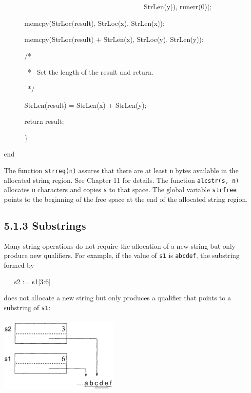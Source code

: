 {\ttfamily\mdseries
\ \ \ \ \ \ \ \ \ \ \ \ \ \ \ \ \ \ \ \ \ \ \ \ \ \ \ \ \ \ \ \ \ \ \ \ \ \ \ \ \ StrLen(y)), runerr(0));}

{\ttfamily\mdseries
\ \ \ \ \ \ memcpy(StrLoc(result), StrLoc(x), StrLen(x));}

{\ttfamily\mdseries
\ \ \ \ \ \ memcpy(StrLoc(result) + StrLen(x), StrLoc(y), StrLen(y));}


\bigskip

{\ttfamily\mdseries
\ \ \ \ \ \ /*}

{\ttfamily\mdseries
\ \ \ \ \ \ \ * \ Set the length of the result and return.}

{\ttfamily\mdseries
\ \ \ \ \ \ \ */}

{\ttfamily\mdseries
\ \ \ \ \ \ StrLen(result) = StrLen(x) + StrLen(y);}

{\ttfamily\mdseries
\ \ \ \ \ \ return result;}

{\ttfamily
\ \ \ \ \ \ \}}

{\ttfamily
end}


The function \texttt{strreq(n)} assures that there are at least
\texttt{n} bytes available in the allocated string region. See Chapter
11 for details. The function \texttt{alcstr(s, n)} allocates
\texttt{n} characters and copies \texttt{s} to that space. The global
variable \texttt{strfree} points to the beginning of the free space at
the end of the allocated string region.

\subsection[5.1.3 Substrings]{5.1.3 Substrings}

Many string operations do not require the allocation of a new string
but only produce new qualifiers. For example, if the value of
\texttt{s1} is \texttt{{\textquotedbl}abcdef{\textquotedbl}}, the
substring formed by

{\ttfamily\mdseries
\ \ \ s2 := s1[3:6]}

\noindent does not allocate a new string but only produces a qualifier
that points to a substring of \texttt{s1}:



\begin{center}
\includegraphics[width=2.3339in,height=1.5516in]{ib-img/ib-img022.png}
\end{center}

